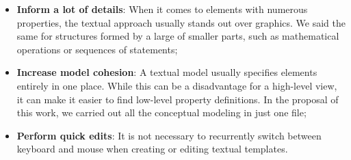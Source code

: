\begin{itemize}
    \item \textbf{Inform a lot of details}: When it comes to elements with numerous properties, the textual approach usually stands out over graphics.
    We said the same for structures formed by a large of smaller parts, such as mathematical operations or sequences of statements;
    \item \textbf{Increase model cohesion}: 
    A textual model usually specifies elements entirely in one place.
    While this can be a disadvantage for a high-level view, it can make it easier to find low-level property definitions.
    In the proposal of this work, we carried out all the conceptual modeling in just one file;
    \item \textbf{Perform quick edits}: 
    It is not necessary to recurrently switch between keyboard and mouse when creating or editing textual templates.

\end{itemize}
